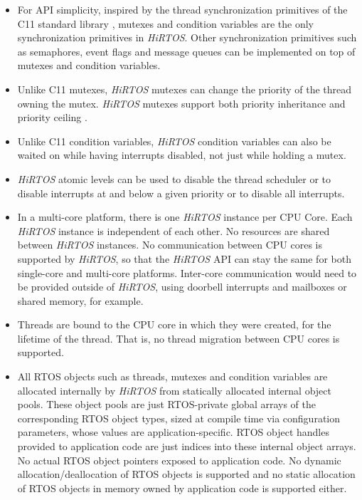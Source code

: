 \documentclass{AUJarticle}
\begin{document}
\begin{itemize}
\item For API simplicity, inspired by the thread synchronization primitives of the C11 standard
library \cite{libcThreads}, mutexes and condition variables are the only synchronization
primitives in \emph{HiRTOS}.
Other synchronization primitives such as semaphores, event flags and message queues can be
implemented on top of mutexes and condition variables.

\item Unlike C11 mutexes, \emph{HiRTOS} mutexes can change the priority of the thread owning the
mutex. \emph{HiRTOS} mutexes support both priority inheritance and priority ceiling \cite{prioCeiling}.

\item Unlike C11 condition variables, \emph{HiRTOS} condition variables
can also be waited on while having interrupts disabled, not just while holding a mutex.

\item \emph{HiRTOS} atomic levels can be used to disable the thread scheduler or to disable interrupts
at and below a given priority or to disable all interrupts.

\item In a multi-core platform, there is one \emph{HiRTOS} instance per CPU Core. Each \emph{HiRTOS} instance is
independent of each other. No resources are shared between \emph{HiRTOS} instances. No communication between
CPU cores is supported by \emph{HiRTOS}, so that the \emph{HiRTOS} API can stay the same for both single-core
and multi-core platforms. Inter-core communication would need to be provided outside of \emph{HiRTOS},
using doorbell interrupts and mailboxes or shared memory, for example.

\item
Threads are bound to the CPU core in which they were created, for the lifetime of the thread. That is,
no thread migration between CPU cores is supported.

\item
All RTOS objects such as threads, mutexes and condition variables are allocated internally
by \emph{HiRTOS} from statically allocated internal object pools.
These object pools are just RTOS-private global arrays of the corresponding RTOS object types,
sized at compile time via configuration parameters, whose values are application-specific.
RTOS object handles provided to application code are just indices into these internal object arrays.
No actual RTOS object pointers exposed to application code.
No dynamic allocation/deallocation of RTOS objects is supported and no static allocation of RTOS
objects in memory owned by application code is supported either.


\end{itemize}
\end{document}
